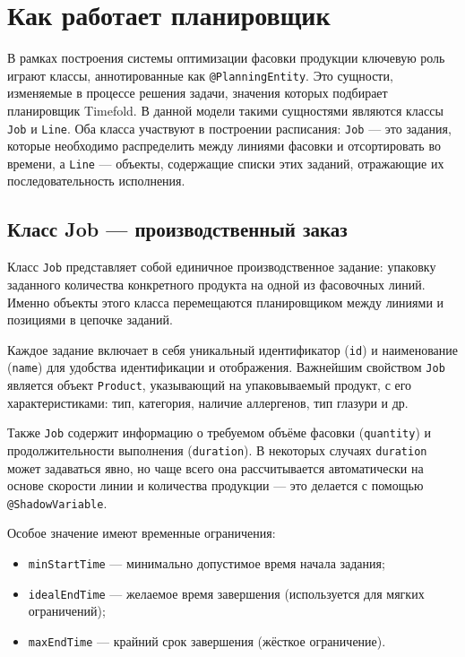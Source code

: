 \section{Как работает планировщик}

В рамках построения системы оптимизации фасовки продукции ключевую роль играют классы, аннотированные как \texttt{@PlanningEntity}. Это сущности, изменяемые в процессе решения задачи, значения которых подбирает планировщик Timefold. В данной модели такими сущностями являются классы \texttt{Job} и \texttt{Line}. Оба класса участвуют в построении расписания: \texttt{Job} — это задания, которые необходимо распределить между линиями фасовки и отсортировать во времени, а \texttt{Line} — объекты, содержащие списки этих заданий, отражающие их последовательность исполнения.

\subsection*{Класс Job — производственный заказ}

Класс \texttt{Job} представляет собой единичное производственное задание: упаковку заданного количества конкретного продукта на одной из фасовочных линий. Именно объекты этого класса перемещаются планировщиком между линиями и позициями в цепочке заданий.

Каждое задание включает в себя уникальный идентификатор (\texttt{id}) и наименование (\texttt{name}) для удобства идентификации и отображения. Важнейшим свойством \texttt{Job} является объект \texttt{Product}, указывающий на упаковываемый продукт, с его характеристиками: тип, категория, наличие аллергенов, тип глазури и др.

Также \texttt{Job} содержит информацию о требуемом объёме фасовки (\texttt{quantity}) и продолжительности выполнения (\texttt{duration}). В некоторых случаях \texttt{duration} может задаваться явно, но чаще всего она рассчитывается автоматически на основе скорости линии и количества продукции — это делается с помощью \texttt{@ShadowVariable}.

Особое значение имеют временные ограничения:
\begin{itemize}
    \item \texttt{minStartTime} — минимально допустимое время начала задания;
    \item \texttt{idealEndTime} — желаемое время завершения (используется для мягких ограничений);
    \item \texttt{maxEndTime} — крайний срок завершения (жёсткое ограничение).
\end{itemize}

